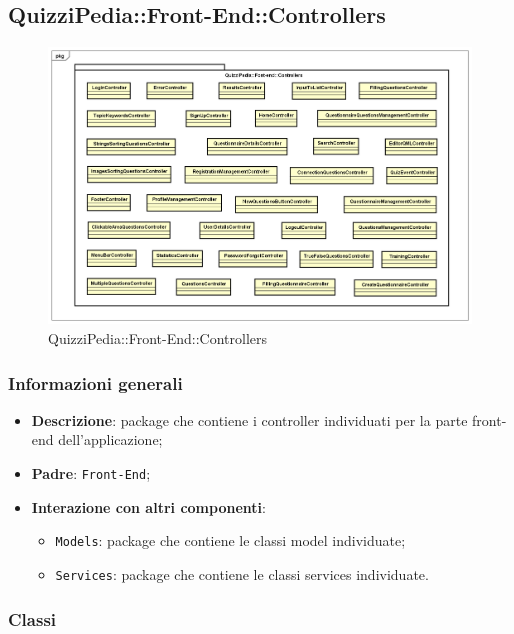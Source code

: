 \newpage
\subsection{QuizziPedia::Front-End::Controllers}


\begin{figure} [ht]
	\centering
	\includegraphics[scale=0.45]{UML/Package/QuizziPedia_Front-End_Controllers.png}
	\caption{QuizziPedia::Front-End::Controllers}
\end{figure} \FloatBarrier

\subsubsection{Informazioni generali}
\begin{itemize}
	\item \textbf{Descrizione}: package che contiene i controller individuati per la parte front-end dell'applicazione;
	\item \textbf{Padre}: \texttt{Front-End};
	\item \textbf{Interazione con altri componenti}:
	\begin{itemize}
		\item \texttt{Models}: package che contiene le classi model individuate;
		\item \texttt{Services}: package che contiene le classi services individuate.
	\end{itemize} 
\end{itemize}
\subsubsection{Classi}




